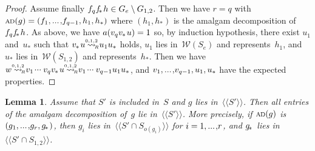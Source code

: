 \documentclass{amsart}
\numberwithin{equation}{section}
\theoremstyle{plain}
\newtheorem{lemm}[prop]{Lemma}
\theoremstyle{definition}
\begin{document}
\begin{proof}
Assume finally ${f}_{q} {{f}_{\hspace{-0.3ex}*\hspace{0.2ex}}} {h} \in {G}_{e} \setminus {G}_{1,2}$. Then we have ${r} = {q}$ with ${{\scriptstyle\mathrm{A\hspace{-0.1ex}D}}({g})} = ({f}_1 {, ...\hspace{0.2ex},} {f}_{{q}-1}, {h}_1, {h}_*)$ where $({h}_1, {h}_*)$ is the amalgam decomposition of~${f}_{q} {{f}_{\hspace{-0.3ex}*\hspace{0.2ex}}} {h}$. As above, we have ${a({{v}_{q} {{v}_{\hspace{-0.1ex}*\hspace{0.2ex}}} {u}})} =\nobreak 1$ so, by induction hypothesis, there exist ${u}_1$ and~${u}_*$ such that ${{v}_{\hspace{-0.1ex}*\hspace{0.2ex}}} {u} {\mathrel{{\mathrel{\overset{\scriptscriptstyle 0,1,2}{\rightsquigarrow}}}_{\hspace{-0.9ex}{\scriptscriptstyle R}}}} {u}_1 {u}_*$ holds, ${u}_1$ lies in~${\mathcal{W}({{S}_{e}})}$ and represents~${h}_1$, and ${u}_*$ lies in~${\mathcal{W}({{S}_{1,2}})}$ and represents~${h}_*$. Then we have ${w} {\mathrel{{\mathrel{\overset{\scriptscriptstyle 0,1,2}{\rightsquigarrow}}}_{\hspace{-0.9ex}{\scriptscriptstyle R}}}} {v}_1 {\hspace{0.2ex}{\cdot}{\cdot}{\cdot}\hspace{0.5ex}} {v}_{q} {{v}_{\hspace{-0.1ex}*\hspace{0.2ex}}} {u} {\mathrel{{\mathrel{\overset{\scriptscriptstyle 0,1,2}{\rightsquigarrow}}}_{\hspace{-0.9ex}{\scriptscriptstyle R}}}} {v}_1 {\hspace{0.2ex}{\cdot}{\cdot}{\cdot}\hspace{0.5ex}} {v}_{{q}-1} {u}_1 {u}_*$, and ${v}_1 {, ...\hspace{0.2ex},} {v}_{{q}-1}, {u}_1, {u}_*$ have the expected properties.
\end{proof}

\begin{lemm}
\label{L:CanDec}
Assume that ${S}'$ is included in~${S}$ and ${g}$ lies in~${\langle\!\langle{{{S}'}}\rangle\!\rangle}$. Then all entries of the amalgam decomposition of~${g}$ lie in~${\langle\!\langle{{{S}'}}\rangle\!\rangle}$. More precisely, if ${{\scriptstyle\mathrm{A\hspace{-0.1ex}D}}({g})}$ is $({g}_1 {, ...\hspace{0.2ex},} {g}_{r}, {{g}_{\hspace{-0.2ex}*\hspace{0.2ex}}})$, then ${g}_{i}$ lies in~${\langle\!\langle{{{S}' \cap {S}_{{o({{g}_{i}})}}}}\rangle\!\rangle}$ for ${i} = 1 {, ...\hspace{0.2ex},} {r}$, and ${{g}_{\hspace{-0.2ex}*\hspace{0.2ex}}}$ lies in~${\langle\!\langle{{{S}' \cap {S}_{1,2}}}\rangle\!\rangle}$.
\end{lemm}
\end{document}
